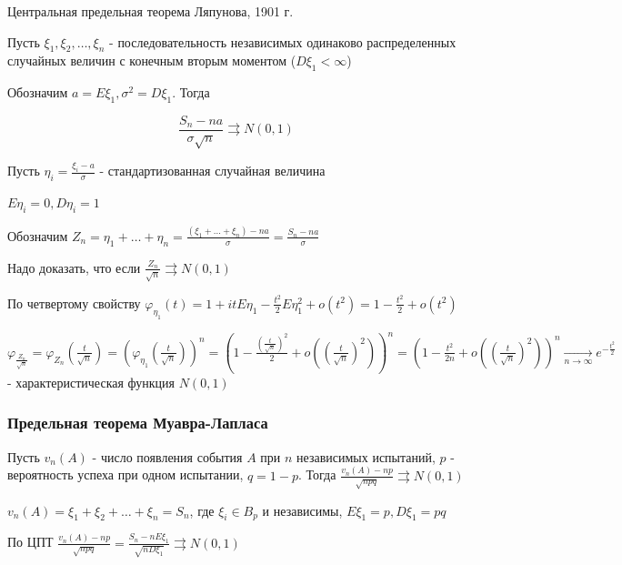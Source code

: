 \documentclass[12pt]{article}
\begin{document}
\begin{MyTheorem}
    \Ths Центральная предельная теорема Ляпунова, 1901 г.

    Пусть $\xi_1, \xi_2, \dots, \xi_n$ - последовательность независимых одинаково распределенных случайных величин с конечным вторым моментом ($D\xi_1 < \infty$)

    Обозначим $a = E\xi_1, \sigma^2 = D\xi_1$. Тогда 

    \[\frac{S_n - na}{\sigma\sqrt{n}} \rightrightarrows N(0, 1)\]
\end{MyTheorem}

\begin{MyProof}
    Пусть $\eta_i = \frac{\xi_i - a}{\sigma}$ - стандартизованная случайная величина

    $E\eta_i = 0, D\eta_i = 1$

    Обозначим $Z_n = \eta_1 + \dots + \eta_n = \frac{(\xi_1 + \dots + \xi_n) - na}{\sigma} = \frac{S_n - na}{\sigma}$

    Надо доказать, что если $\frac{Z_n}{\sqrt{n}} \rightrightarrows N(0, 1)$

    По четвертому свойству $\varphi_{\eta_1}(t) = 1 + itE\eta_1 - \frac{t^2}{2} E\eta_1^2 + o(t^2) = 1 - \frac{t^2}{2} + o(t^2)$

    $\varphi_{\frac{Z_n}{\sqrt{n}}} = \varphi_{Z_n}\left(\frac{t}{\sqrt{n}}\right) = \left(\varphi_{\eta_1}\left(\frac{t}{\sqrt{n}}\right)\right)^n = 
    \left(1 - \frac{\left(\frac{t}{\sqrt{n}}\right)^2}{2} + o\left(\left(\frac{t}{\sqrt{n}}\right)^2\right)\right)^n =
    \left(1 - \frac{t^2}{2n} + o\left(\left(\frac{t}{\sqrt{n}}\right)^2\right)\right)^n \underset{n \to \infty}{\longrightarrow} e^{-\frac{t^2}{2}}$ - 
    характеристическая функция $N(0, 1)$
\end{MyProof}

\hypertarget{limittheoremdemoivrelaplace}{}

\subsubsection{Предельная теорема Муавра-Лапласа}

\begin{MyTheorem}
    \Ths Пусть $v_n(A)$ - число появления события $A$ при $n$ независимых испытаний, $p$ - вероятность успеха при одном испытании, $q = 1 - p$.
    Тогда $\frac{v_n(A) - np}{\sqrt{npq}} \rightrightarrows N(0, 1)$
\end{MyTheorem}

\begin{MyProof}
    $v_n(A) = \xi_1 + \xi_2 + \dots + \xi_n = S_n$, где $\xi_i \in B_p$ и независимы, $E\xi_1 = p, D\xi_1 = pq$

    По ЦПТ $\frac{v_n(A) - np}{\sqrt{npq}} = \frac{S_n - nE\xi_1}{\sqrt{nD\xi_1}} \rightrightarrows N(0, 1)$
\end{MyProof}
\end{document}
